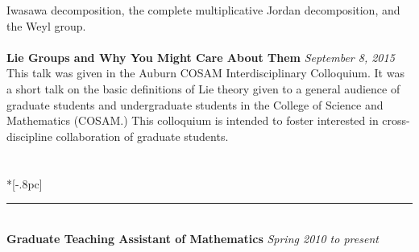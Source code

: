 \documentclass{article}
\begin{document}
Iwasawa decomposition, the complete multiplicative Jordan decomposition, and the
Weyl group.
\\ \\
\textbf{Lie Groups and Why You Might Care About Them} \hfill \textit{September
  8, 2015} \\
This talk was given in the Auburn COSAM Interdisciplinary Colloquium. It was a
short talk on the basic definitions of Lie theory given to a general audience of
graduate students and undergraduate students in the College of Science and
Mathematics (COSAM.) This colloquium is intended to foster interested in
cross-discipline collaboration of graduate students.\\
\\
 \\*[-.8pc]
\rule{\textwidth}{.1pt} \\
{\bf Graduate Teaching Assistant of Mathematics} \hfill {\it Spring 2010 to present\/}
\end{document}
